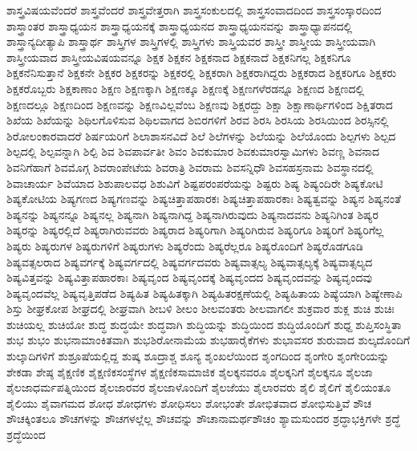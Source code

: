 {ಶಾಸ್ತ್ರವಿಷಯವೆಂದರೆ
ಶಾಸ್ತ್ರವೆಂದರೆ
ಶಾಸ್ತ್ರವೇತ್ತರಾಗಿ
ಶಾಸ್ತ್ರಸಂಕುಲದಲ್ಲಿ
ಶಾಸ್ತ್ರಸಂವಾದದಿಂದ
ಶಾಸ್ತ್ರಸಂಸ್ಕಾರದಿಂದ
ಶಾಸ್ತ್ರಾಂತರ
ಶಾಸ್ತ್ರಾಧ್ಯಯನ
ಶಾಸ್ತ್ರಾಧ್ಯಯನಕ್ಕೆ
ಶಾಸ್ತ್ರಾಧ್ಯಯನದ
ಶಾಸ್ತ್ರಾಧ್ಯಯನವನ್ನು
ಶಾಸ್ತ್ರಾಧ್ಯಾಪನದಲ್ಲಿ
ಶಾಸ್ತ್ರಾನ್ಯದೀತ್ಯಾಪಿ
ಶಾಸ್ತ್ರಾರ್ಥ
ಶಾಸ್ತ್ರಿಗಳ
ಶಾಸ್ತ್ರಿಗಳಲ್ಲಿ
ಶಾಸ್ತ್ರಿಗಳು
ಶಾಸ್ತ್ರಿಯವರ
ಶಾಸ್ತ್ರೀ
ಶಾಸ್ತ್ರೀಯ
ಶಾಸ್ತ್ರೀಯವಾಗಿ
ಶಾಸ್ತ್ರೀಯವಾದ
ಶಾಸ್ತ್ರೀಯವಿಷಯವನ್ನೂ
ಶಿಕ್ಷಕ
ಶಿಕ್ಷಕನ
ಶಿಕ್ಷಕನಾದ
ಶಿಕ್ಷಕನಾದೆ
ಶಿಕ್ಷಕನಿಗಲ್ಲ
ಶಿಕ್ಷಕನಿಗೂ
ಶಿಕ್ಷಕನೆನಿಸುತ್ತಾನೆ
ಶಿಕ್ಷಕನೇ
ಶಿಕ್ಷಕರ
ಶಿಕ್ಷಕರನ್ನು
ಶಿಕ್ಷಕರಲ್ಲಿ
ಶಿಕ್ಷಕರಾಗಿ
ಶಿಕ್ಷಕರಾಗಿದ್ದರು
ಶಿಕ್ಷಕರಾದ
ಶಿಕ್ಷಕರಿಗೂ
ಶಿಕ್ಷಕರು
ಶಿಕ್ಷಕರೊಬ್ಬರು
ಶಿಕ್ಷಕಾಣಾಂ
ಶಿಕ್ಷಣ
ಶಿಕ್ಷಣಕ್ಕಾಗಿ
ಶಿಕ್ಷಣಕ್ಕೂ
ಶಿಕ್ಷಣಕ್ಕೆ
ಶಿಕ್ಷಣಗಳೆರಡನ್ನೂ
ಶಿಕ್ಷಣದ
ಶಿಕ್ಷಣದಲ್ಲಿ
ಶಿಕ್ಷಣದಲ್ಲೂ
ಶಿಕ್ಷಣದಿಂದ
ಶಿಕ್ಷಣವನ್ನು
ಶಿಕ್ಷಣವಿಲ್ಲವೆಂಬ
ಶಿಕ್ಷಣವು
ಶಿಕ್ಷರದ್ದು
ಶಿಕ್ಷಾ
ಶಿಕ್ಷಾಣಾರ್ಥಿಗಳಿಂದ
ಶಿಕ್ಷಿತರಾದ
ಶಿಖೆಯ
ಶಿಖೆಯನ್ನು
ಶಿಥಿಲಗೊಳಿಸುವ
ಶಿಥಿಲವಾಗದ
ಶಿಬಿರಗಳಿಗೆ
ಶಿರವ
ಶಿರಸಿ
ಶಿರಸಿಯ
ಶಿರಸಿಯಿಂದ
ಶಿರಸ್ಸಿನಲ್ಲಿ
ಶಿರೋಲಂಕಾರವಾದರೆ
ಶಿರ್ಷಯರಿಗೆ
ಶಿಲಾಶಾಸನವಿದೆ
ಶಿಲೆ
ಶಿಲೆಗಳನ್ನು
ಶಿಲೆಯನ್ನು
ಶಿಲೆಯೊಂದು
ಶಿಲ್ಪಗಳು
ಶಿಲ್ಪದ
ಶಿಲ್ಪದಲ್ಲಿ
ಶಿಲ್ಪವನ್ನಾಗಿ
ಶಿಲ್ಪಿ
ಶಿವ
ಶಿವಪಾರ್ವತೀ
ಶಿವಂ
ಶಿವಕುಮಾರ
ಶಿವಕುಮಾರಸ್ವಾಮಿಗಳು
ಶಿವಣ್ಣ
ಶಿವನಾದ
ಶಿವನಿಗೆಹಾಗೆ
ಶಿವಮೊಗ್ಗ
ಶಿವರಾಂಪೇಟೆಯ
ಶಿವರಾತ್ರಿ
ಶಿವರಾಮ
ಶಿವಸನ್ನಿಧೌ
ಶಿವಸಹಸ್ರನಾಮ
ಶಿವಸ್ಥಾನದಲ್ಲಿ
ಶಿವಾಚಾರ್ಯ
ಶಿವೆಯಾದ
ಶಿಶುಪಾಲವಧ
ಶಿಶುವಿಗೆ
ಶಿಷ್ಟಪರಂಪರೆಯನ್ನು
ಶಿಷ್ಟರು
ಶಿಷ್ಯ
ಶಿಷ್ಯಂದಿರೇ
ಶಿಷ್ಯಕೋಟಿ
ಶಿಷ್ಯಕೋಟಿಯ
ಶಿಷ್ಯಗಣದ
ಶಿಷ್ಯಗಣವನ್ನು
ಶಿಷ್ಯಚಿತ್ತಾಪಹಾರಕಃ
ಶಿಷ್ಯಚಿತ್ತಾಪಹಾರಕಾಃ
ಶಿಷ್ಯತ್ವವನ್ನು
ಶಿಷ್ಯನ
ಶಿಷ್ಯನಂತೆ
ಶಿಷ್ಯನನ್ನು
ಶಿಷ್ಯನನ್ನೂ
ಶಿಷ್ಯನಲ್ಲ
ಶಿಷ್ಯನಾಗಿ
ಶಿಷ್ಯನಾಗಿದ್ದ
ಶಿಷ್ಯನಾಗಿರುವುದು
ಶಿಷ್ಯನಾದವನು
ಶಿಷ್ಯನಿಗಿಂತ
ಶಿಷ್ಯರ
ಶಿಷ್ಯರನ್ನು
ಶಿಷ್ಯರಲ್ಲಿದೆ
ಶಿಷ್ಯರಾಗಿರುವವರು
ಶಿಷ್ಯರಾದ
ಶಿಷ್ಯರಿಗಾಗಿ
ಶಿಷ್ಯರಿಗಿರುವ
ಶಿಷ್ಯರಿಗೂ
ಶಿಷ್ಯರಿಗೆ
ಶಿಷ್ಯರಿಗೆಲ್ಲ
ಶಿಷ್ಯರು
ಶಿಷ್ಯರುಗಳ
ಶಿಷ್ಯರುಗಳಿಗೆ
ಶಿಷ್ಯರುಗಳು
ಶಿಷ್ಯರೆಂದು
ಶಿಷ್ಯರೆಲ್ಲರೂ
ಶಿಷ್ಯರೊಂದಿಗೆ
ಶಿಷ್ಯರೊಡಗೂಡಿ
ಶಿಷ್ಯವತ್ಸಲರಾದ
ಶಿಷ್ಯವರ್ಗಕ್ಕೆ
ಶಿಷ್ಯವರ್ಗದಲ್ಲಿ
ಶಿಷ್ಯವರ್ಗದವರು
ಶಿಷ್ಯವಾತ್ಸಲ್ಯ
ಶಿಷ್ಯವಾತ್ಸಲ್ಯಕ್ಕೆ
ಶಿಷ್ಯವಾತ್ಸಲ್ಯದ
ಶಿಷ್ಯವಿತ್ತವನ್ನು
ಶಿಷ್ಯವಿತ್ತಾಪಹಾರಕಾಃ
ಶಿಷ್ಯವೃಂದ
ಶಿಷ್ಯವೃಂದಕ್ಕೆ
ಶಿಷ್ಯವೃಂದದ
ಶಿಷ್ಯವೃಂದವನ್ನು
ಶಿಷ್ಯವೃಂದವು
ಶಿಷ್ಯವೃಂದವೆಲ್ಲ
ಶಿಷ್ಯವೃತ್ತಿಪಡೆದ
ಶಿಷ್ಯಹಿತ
ಶಿಷ್ಯಹಿತಕ್ಕಾಗಿ
ಶಿಷ್ಯಹಿತರಕ್ಷಣೆಯಲ್ಲಿ
ಶಿಷ್ಯಹಿತಾಯ
ಶಿಷ್ಯೆಯಾಗಿ
ಶಿಷ್ಯೇಣಾಪಿ
ಶಿಸ್ತು
ಶೀಘ್ರಕೋಪ
ಶೀಘ್ರದಲ್ಲಿ
ಶೀಘ್ರವಾಗಿ
ಶೀಬಳಿ
ಶೀಲಂ
ಶೀಲವಂತರು
ಶೀಲವಾಗಲೀ
ಶುಕ್ರವಾರ
ಶುಕ್ಲ
ಶುಚಿ
ಶುಚಿಃ
ಶುಚಿಯಲ್ಲ
ಶುಚಿಯೋ
ಶುದ್ಧ
ಶುದ್ಧಯೇ
ಶುದ್ಧವಾಗಿ
ಶುದ್ಧಿಯನ್ನು
ಶುದ್ಧಿಯಿಂದ
ಶುದ್ಧಿಯೊಂದಿಗೆ
ಶುಧ್ದ
ಶುಪ್ತಿಸಂಸ್ಥಿತಾ
ಶುಭ
ಶುಭಂ
ಶುಭನಾಮಾಂಕಿತವಾಗಿ
ಶುಭಶಿರೋನಾಮೆಯ
ಶುಭಹಾರೈಕೆಗಳು
ಶುಭಾವಸರ
ಶುರುವಾದ
ಶುಲ್ಕದೊಂದಿಗೆ
ಶುಲ್ಕಾದಿಗಳಿಗೆ
ಶುಶ್ರೂಷೆಯಲ್ಲಿದ್ದ
ಶುಷ್ಕ
ಶೂದ್ರಾಶ್ಚ
ಶೂನ್ಯ
ಶೃಂಖಲೆಯಿಂದ
ಶೃಂಗದಿಂದ
ಶೃಂಗೇರಿ
ಶೃಂಗೇರಿಯನ್ನು
ಶೇಕಡಾ
ಶೇಷ್ಠ
ಶೈಕ್ಷಣಿಕ
ಶೈಕ್ಷಣಿಕಸಂಸ್ಥೆಗಳ
ಶೈಕ್ಷಣಿಕಸಾಮಾಜಿಕ
ಶೈಲಕ್ಕನವರೂ
ಶೈಲಕ್ಕನಿಗೆ
ಶೈಲಕ್ಕನೂ
ಶೈಲಜಾ
ಶೈಲಜಾಧರ್ಮಪತ್ನಿಯಿಂದ
ಶೈಲಜಾರವರ
ಶೈಲಜಾಳೊಂದಿಗೆ
ಶೈಲಜೆಯು
ಶೈಲಾರವರು
ಶೈಲಿ
ಶೈಲಿಗೆ
ಶೈಲಿಯಂತೂ
ಶೈಲಿಯು
ಶೈವಾಗಮದ
ಶೋಧ
ಶೋಧಗಳು
ಶೋಧಿಸಲು
ಶೋಭಂತೇ
ಶೋಭಿತವಾದ
ಶೋಭಿಸುತ್ತಿವೆ
ಶೌಚ
ಶೌಚಕ್ಕಿಂತಲೂ
ಶೌಚಗಳನ್ನು
ಶೌಚಗಳಲ್ಲೆಲ್ಲ
ಶೌಚವನ್ನು
ಶೌಚಾನಾಮರ್ಥಶೌಚಂ
ಶ್ಯಾಮಸುಂದರ
ಶ್ರದ್ಧಾಭಕ್ತಿಗಳೇ
ಶ್ರದ್ಧೆ
ಶ್ರದ್ಧೆಯಿಂದ
}
